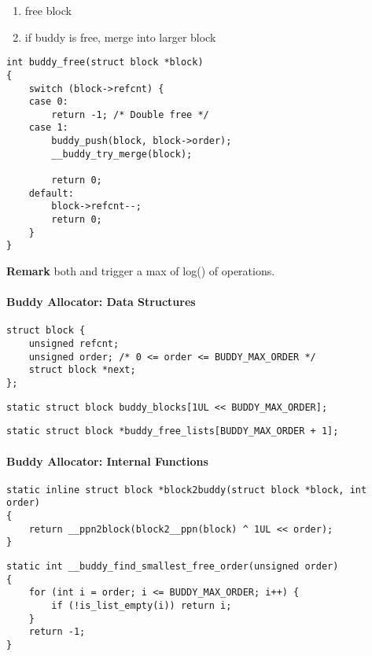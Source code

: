 \newpar{}
\begin{enumerate}
    \item free block
    \item if buddy is free, merge into larger block
\end{enumerate}
\begin{lstlisting}[style=bright_C++]
int buddy_free(struct block *block)
{
    switch (block->refcnt) {
    case 0:
        return -1; /* Double free */
    case 1:
        buddy_push(block, block->order);
        __buddy_try_merge(block);

        return 0;
    default:
        block->refcnt--;
        return 0;
    }
}
\end{lstlisting}

\textbf{Remark} both  and  trigger a max of log() of operations. %

\paragraph{Buddy Allocator: Data Structures}
\begin{lstlisting}[style=bright_C++]
struct block {
    unsigned refcnt;
    unsigned order; /* 0 <= order <= BUDDY_MAX_ORDER */
    struct block *next;
};
\end{lstlisting}
\newpar{}
\begin{lstlisting}[style=bright_C++]
static struct block buddy_blocks[1UL << BUDDY_MAX_ORDER];
\end{lstlisting}

\begin{lstlisting}[style=bright_C++]
static struct block *buddy_free_lists[BUDDY_MAX_ORDER + 1];
\end{lstlisting}

\paragraph{Buddy Allocator: Internal Functions}
\begin{lstlisting}[style=bright_C++]
static inline struct block *block2buddy(struct block *block, int order)
{
    return __ppn2block(block2__ppn(block) ^ 1UL << order);
}
\end{lstlisting}

\newpar{}
\begin{lstlisting}[style=bright_C++]
static int __buddy_find_smallest_free_order(unsigned order)
{
    for (int i = order; i <= BUDDY_MAX_ORDER; i++) {
        if (!is_list_empty(i)) return i;
    }
    return -1;
}
\end{lstlisting}

